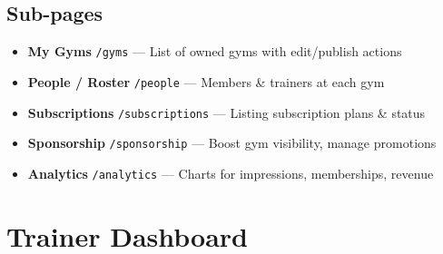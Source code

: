 \documentclass[a4paper,11pt]{article}
\begin{document}
\subsection{Sub-pages}
{\footnotesize
\begin{itemize}[nosep]
  \item \textbf{My Gyms} \texttt{/gyms} — List of owned gyms with edit/publish actions
  \item \textbf{People / Roster} \texttt{/people} — Members \& trainers at each gym
  \item \textbf{Subscriptions} \texttt{/subscriptions} — Listing subscription plans \& status
  \item \textbf{Sponsorship} \texttt{/sponsorship} — Boost gym visibility, manage promotions
  \item \textbf{Analytics} \texttt{/analytics} — Charts for impressions, memberships, revenue
\end{itemize}
}

\newpage
\section{Trainer Dashboard}
\end{document}
